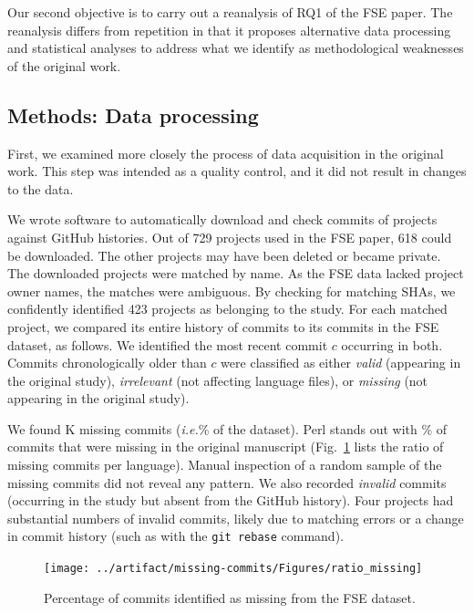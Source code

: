 \documentclass[acmsmall]{acmart}
\newcommand{\pct}[1]{#1\!\!\%\xspace}
\newcommand{\gh}{{GitHub}\xspace}
\newcommand{\code}[1]{{\tt\small #1}\xspace}
\newcommand{\ie}{\emph{i.e.}\xspace}
\begin{document}
Our second objective is to carry out a reanalysis of RQ1 of the FSE paper.
The reanalysis differs from repetition in that it proposes alternative data
processing and statistical analyses to address what we identify as
methodological weaknesses of the original work.

\subsection{Methods: Data processing}\label{sec:methods:dataprocess}

First, we examined more closely the process of data acquisition in the
original work. This step was intended as a quality control, and it did not
result in changes to the data. 

We wrote software to automatically download and check commits of projects
against \gh histories. Out of 729 projects used in the FSE paper, 618 could
be downloaded. The other projects may have been deleted or became private. 
The downloaded projects were matched by name. As the FSE data lacked project
owner names, the matches were ambiguous.  By checking for matching SHAs, we
confidently identified 423 projects as belonging to the study.  
For each matched project, we compared its entire history of commits to its
commits in the FSE dataset, as follows. We identified the most recent commit
$c$ occurring in both. Commits chronologically older than $c$ were
classified as either {\it valid} (appearing in the original study), {\it
  irrelevant} (not affecting language files), or {\it missing} (not
appearing in the original study).  

We found \MissingCommitsThousands\!K missing commits
(\ie \pct{\MissingCommitsRatio} of the dataset). Perl stands out with
\pct{\PerlMissingRatio} of commits that were missing in the original
manuscript (Fig.~\ref{miss} lists the ratio of missing commits per
language). Manual inspection of a random sample of the missing commits did
not reveal any pattern.  
We also recorded {\it invalid} commits (occurring in the study but absent
from the \gh history). Four projects had substantial numbers of invalid
commits, likely due to matching errors or a change in commit history (such
as with the \code{git rebase} command).

\begin{figure}[!h]
\texttt{[image: ../artifact/missing-commits/Figures/ratio\_missing]}
\vspace{-8mm}
\caption{Percentage of commits identified as missing from the FSE dataset.}\label{miss}%
\end{figure}
\end{document}
